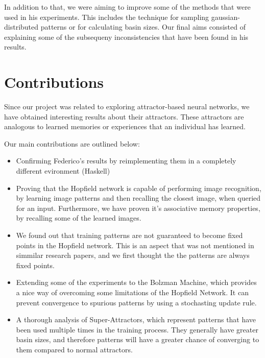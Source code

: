 In addition to that, we were aiming to improve some of the methods that were used in his experiments. This includes the technique for sampling gaussian-distributed patterns or for calculating basin sizes. Our final aims consisted of explaining some of the subsequeny inconsistencies that have been found in his results. 

\section{Contributions}

Since our project was related to exploring attractor-based neural networks, we have obtained interesting results about their attractors. These attractors are analogous to learned memories or experiences that an individual has learned. 


Our main contributions are outlined below:
\begin{itemize}
\item Confirming Federico's results by reimplementing them in a completely different evironment (Haskell)
\item Proving that the Hopfield network is capable of performing image recognition, by learning image patterns and then recalling the closest image, when queried for an input. Furthermore, we have proven it's associative memory properties, by recalling some of the learned images. 
\item We found out that training patterns are not guaranteed to become fixed points in the Hopfield network. This is an aspect that was not mentioned in simmilar research papers, and we first thought the the patterns are always fixed points.
\item Extending some of the experiments to the Bolzman Machine, which provides a nice way of overcoming some limitations of the Hopfield Network. It can prevent convergence to spurious patterns by using a stochasting update rule. 
\item A thorough analysis of Super-Attractors, which represent patterns that have been used multiple times in the training process. They generally have greater basin sizes, and therefore patterns will have a greater chance of converging to them compared to normal attractors. 
\end{itemize}
